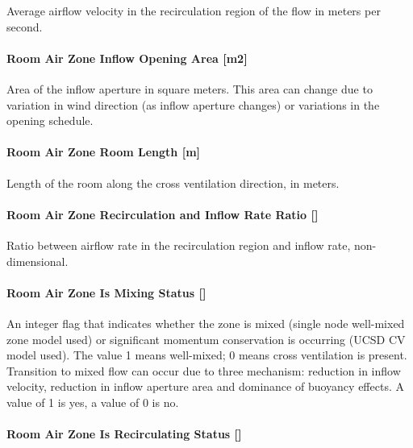 Average airflow velocity in the recirculation region of the flow in meters per second.

\paragraph{Room Air Zone Inflow Opening Area {[}m2{]}}\label{room-air-zone-inflow-opening-area-m2-1}

Area of the inflow aperture in square meters. This area can change due to variation in wind direction (as inflow aperture changes) or variations in the opening schedule.

\paragraph{Room Air Zone Room Length {[}m{]}}\label{room-air-zone-room-length-m-1}

Length of the room along the cross ventilation direction, in meters.

\paragraph{\texorpdfstring{Room Air Zone Recirculation and Inflow Rate Ratio {[]}}{Room Air Zone Recirculation and Inflow Rate Ratio }}\label{room-air-zone-recirculation-and-inflow-rate-ratio-1}

Ratio between airflow rate in the recirculation region and inflow rate, non-dimensional.

\paragraph{\texorpdfstring{Room Air Zone Is Mixing Status {[]}}{Room Air Zone Is Mixing Status }}\label{room-air-zone-is-mixing-status-1}

An integer flag that indicates whether the zone is mixed (single node well-mixed zone model used) or significant momentum conservation is occurring (UCSD CV model used). The value 1 means well-mixed; 0 means cross ventilation is present. Transition to mixed flow can occur due to three mechanism: reduction in inflow velocity, reduction in inflow aperture area and dominance of buoyancy effects. A value of 1 is yes, a value of 0 is no.

\paragraph{\texorpdfstring{Room Air Zone Is Recirculating Status {[]}}{Room Air Zone Is Recirculating Status }}\label{room-air-zone-is-recirculating-status-1}

